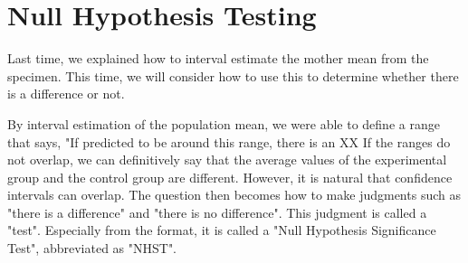 \documentclass{ltjsbook}
\begin{document}
\chapter{Null Hypothesis Testing}
\label{m18_NHST}
Last time, we explained how to interval estimate the mother mean from the specimen. This time, we will consider how to use this to determine whether there is a difference or not.

By interval estimation of the population mean, we were able to define a range that says, "If predicted to be around this range, there is an XX%
If the ranges do not overlap, we can definitively say that the average values of the experimental group and the control group are different. However, it is natural that confidence intervals can overlap. The question then becomes how to make judgments such as "there is a difference" and "there is no difference".
This judgment is called a "test". Especially from the format, it is called a "Null Hypothesis Significance Test", abbreviated as "NHST".
\end{document}
